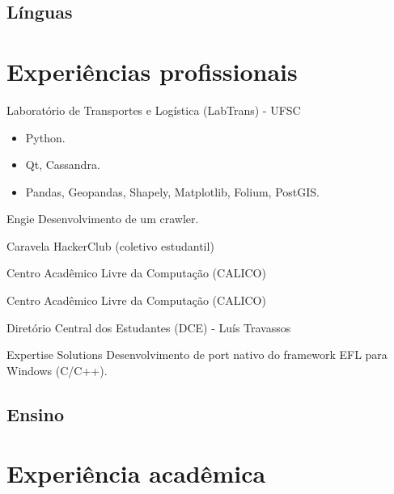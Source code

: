 \documentclass[11pt,a4paper]{moderncv}
\begin{document}
    \subsection{Línguas}

\newpage

\section{Experiências profissionais}
    {Laboratório de Transportes e Logística (LabTrans) - UFSC}
    {}{}{
        \begin{itemize}
            \item Python.
            \item Qt, Cassandra.
            \item Pandas, Geopandas, Shapely, Matplotlib, Folium, PostGIS.
        \end{itemize}
    }

    {Engie}
    {}{}{Desenvolvimento de um crawler.}

    {Caravela HackerClub}
    {(coletivo estudantil)}{}{}

    {Centro Acadêmico Livre da Computação (CALICO)}
    {}{}{}

    {Centro Acadêmico Livre da Computação (CALICO)}
    {}{}{}

    {Diretório Central dos Estudantes (DCE) - Luís Travassos}
    {}{}{}

    {Expertise Solutions}
    {}{}{Desenvolvimento de port nativo do framework EFL para Windows (C/C++).}

    \subsection{Ensino}

\section{Experiência acadêmica}
\end{document}
